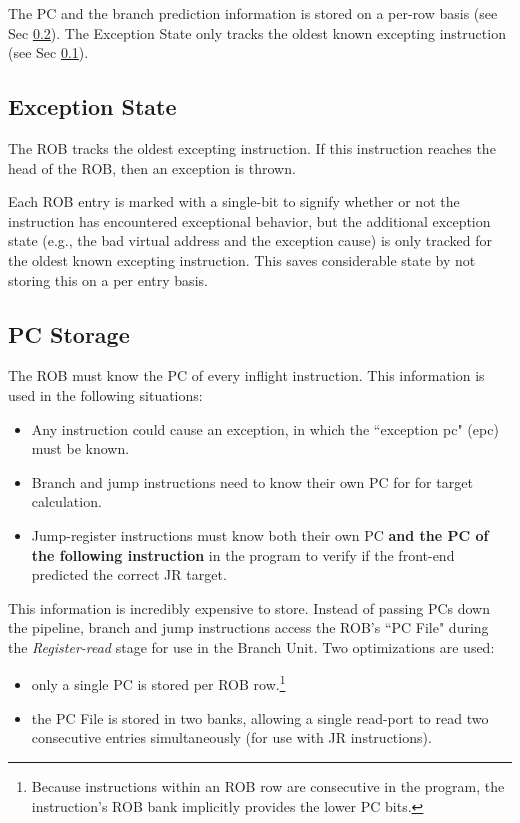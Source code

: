 The PC and the branch prediction information is stored on a per-row basis (see Sec \ref{sec:pcstorage}).  The Exception State only tracks the oldest known excepting instruction (see Sec \ref{sec:rob_xcpt}). 

\subsection{Exception State}\label{sec:rob_xcpt}

The ROB tracks the oldest excepting instruction. If this instruction reaches the head of the ROB, then an exception is thrown. 

Each ROB entry is marked with a single-bit to signify whether or not the instruction has encountered exceptional behavior, but the additional exception state (e.g., the bad virtual address and the exception cause) is only tracked for the oldest known excepting instruction.  This saves considerable state by not storing this on a per entry basis. 

\subsection{PC Storage}\label{sec:pcstorage}

The ROB must know the PC of every inflight instruction.  This information is used in the following situations:

\begin{itemize}
\item Any instruction could cause an exception, in which the ``exception pc" (epc) must be known.
\item Branch and jump instructions need to know their own PC for for target calculation.
\item Jump-register instructions must know both their own PC {\bf and the PC of the following instruction} in the program to verify if the front-end predicted the correct JR target.
\end{itemize}

This information is incredibly expensive to store. Instead of passing PCs down the pipeline, branch and jump instructions access the ROB's ``PC File" during the {\em Register-read} stage for use in the Branch Unit. Two optimizations are used:


\begin{itemize}
\item only a single PC is stored per ROB row.\footnote{Because instructions within an ROB row are consecutive in the program, the instruction's ROB bank implicitly provides the lower PC bits.}
\item the PC File is stored in two banks, allowing a single read-port to read two consecutive entries simultaneously (for use with JR instructions).
\end{itemize}

